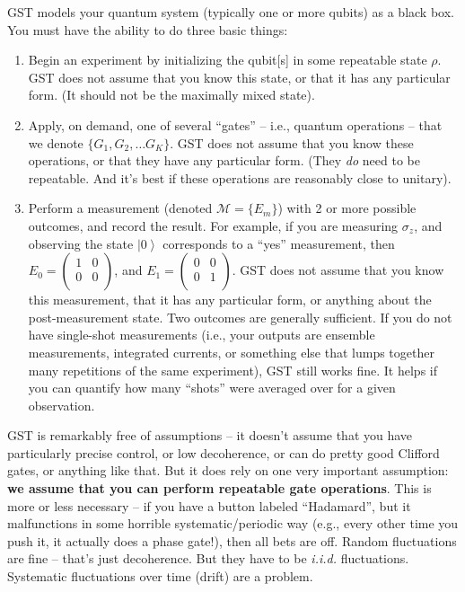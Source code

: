 \documentclass{article}[11pt]
\newcommand{\ket}[1]{\ensuremath{\left|#1\right\rangle}}
\newcommand{\cM}{\mathcal{M}}
\begin{document}
GST models your quantum system (typically one or more qubits) as a black box.  You must have the ability to do three basic things:
\begin{enumerate}
\item Begin an experiment by initializing the qubit[s] in some repeatable state $\rho$.  GST does not assume that you know this state, or that it has any particular form.  (It should not be the maximally mixed state).
\item Apply, on demand, one of several ``gates'' -- i.e., quantum operations -- that we denote $\{G_1,G_2,\ldots G_K\}$.  GST does not assume that you know these operations, or that they have any particular form.  (They \emph{do} need to be repeatable.  And it's best if these operations are reasonably close to unitary).
\item Perform a measurement (denoted $\cM = \{E_m\}$) with 2 or more possible outcomes, and record the result.  For example, if you are measuring $\sigma_z$, and observing the state $\ket{0}$ corresponds to a ``yes'' measurement, then $E_0=\left(
\begin{array}{cc}
1 & 0 \\
0 & 0 \\
\end{array}\right)$, and 
$E_1=\left(
\begin{array}{cc}
0 & 0 \\
0 & 1 \\
\end{array}\right)$.
GST does not assume that you know this measurement, that it has any particular form, or anything about the post-measurement state.  Two outcomes are generally sufficient.  If you do not have single-shot measurements (i.e., your outputs are ensemble measurements, integrated currents, or something else that lumps together many repetitions of the same experiment), GST still works fine.  It helps if you can quantify how many ``shots'' were averaged over for a given observation.
\end{enumerate}

GST is remarkably free of assumptions -- it doesn't assume that you have particularly precise control, or low decoherence, or can do pretty good Clifford gates, or anything like that.  But it does rely on one very important assumption:  \textbf{we assume that you can perform repeatable gate operations}.  This is more or less necessary -- if you have a button labeled ``Hadamard'', but it malfunctions in some horrible systematic/periodic way (e.g., every other time you push it, it actually does a phase gate!), then all bets are off.  Random fluctuations are fine -- that's just decoherence.  But they have to be \emph{i.i.d.} fluctuations.  Systematic fluctuations over time (drift) are a problem.
\end{document}
